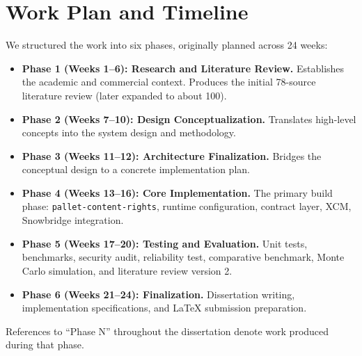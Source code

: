 
\chapter{Work Plan and Timeline}\label{app:work-plan}

We structured the work into six phases, originally planned across 24 weeks:

\begin{itemize}
\item \textbf{Phase 1 (Weeks 1--6): Research and Literature Review.} Establishes the academic and commercial context. Produces the initial 78-source literature review (later expanded to about 100).
\item \textbf{Phase 2 (Weeks 7--10): Design Conceptualization.} Translates high-level concepts into the system design and methodology.
\item \textbf{Phase 3 (Weeks 11--12): Architecture Finalization.} Bridges the conceptual design to a concrete implementation plan.
\item \textbf{Phase 4 (Weeks 13--16): Core Implementation.} The primary build phase: \texttt{pallet-content-rights}, runtime configuration, contract layer, XCM, Snowbridge integration.
\item \textbf{Phase 5 (Weeks 17--20): Testing and Evaluation.} Unit tests, benchmarks, security audit, reliability test, comparative benchmark, Monte Carlo simulation, and literature review version 2.
\item \textbf{Phase 6 (Weeks 21--24): Finalization.} Dissertation writing, implementation specifications, and LaTeX submission preparation.
\end{itemize}

References to ``Phase N'' throughout the dissertation denote work produced during that phase.
